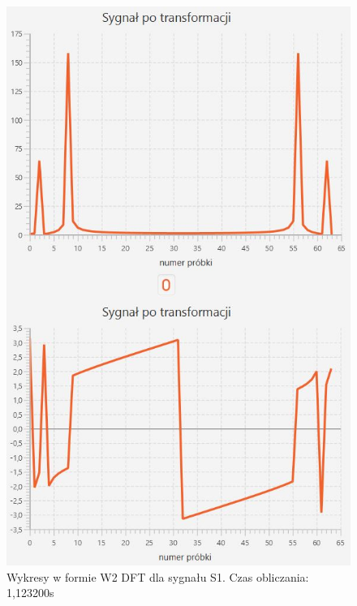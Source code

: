 \documentclass[12pt]{article}
\begin{document}
\begin{figure}[H]
	\centering
	\includegraphics[width=.8\linewidth]{DFT-S1-W2}
	\caption{Wykresy w formie W2 DFT dla sygnału S1. Czas obliczania: 1,123200s}
	\label{S3_sygnal}
\end{figure}
\end{document}
